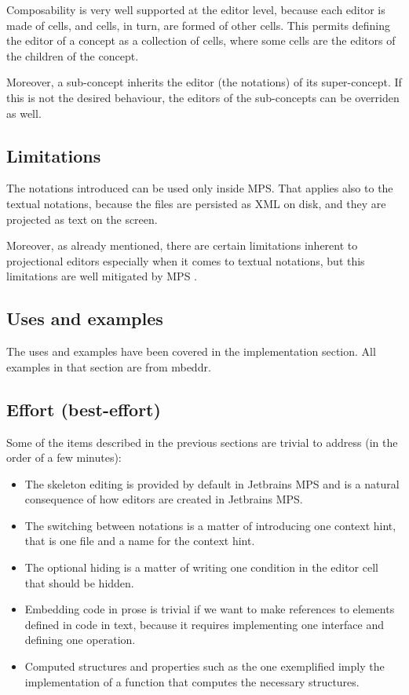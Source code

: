 \documentclass[preprint,numbers,10pt]{sigplanconf}
\begin{document}
Composability is very well supported at the editor level, because each editor is made of cells,
and cells, in turn, are formed of other cells. This permits defining
the editor of a concept as a collection of cells, where some cells are the editors of the children of the concept.

Moreover, a sub-concept inherits the editor (the notations) of its super-concept. If this is not the desired behaviour,
the editors of the sub-concepts can be overriden as well.

\subsection{Limitations}
The notations introduced can be used only inside MPS. That applies also to the textual notations, because
the files are persisted as XML on disk, and they are projected as text on the screen. 

Moreover, as already mentioned, there are certain limitations inherent to projectional editors especially
when it comes to textual notations, but this limitations are well mitigated by MPS \cite{voelter2014towards}.

\subsection{Uses and examples}
The uses and examples have been covered in the implementation section.
All examples in that section are from mbeddr.

\subsection{Effort (best-effort)}
Some of the items described in the previous sections are trivial to address (in the order of a few minutes):
\begin{itemize}
\item The skeleton editing is provided by default in Jetbrains MPS and is a natural consequence
of how editors are created in Jetbrains MPS.
\item The switching between notations is a matter of introducing one context hint, that is one file and a name for the
context hint.
\item The optional hiding is a matter of writing one condition in the editor cell
that should be hidden.
\item Embedding code in prose is trivial if we want to make references to elements defined in code in text, because
it requires implementing one interface and defining one operation.
\item Computed structures and properties such as the one exemplified imply the implementation of a function that computes the
necessary structures.
\end{itemize}
\end{document}
